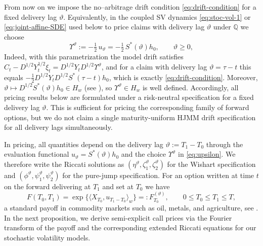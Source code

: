 \documentclass[10pt,a4paper,reqno]{amsart}
\numberwithin{equation}{section}
\theoremstyle{plain}
\theoremstyle{definition}
\theoremstyle{example}
\newcommand{\MQ}{\mathbb{Q}}
\begin{document}
From now on we impose the no–arbitrage drift condition \eqref{eq:drift-condition} for a fixed delivery lag $\vartheta$. 
Equivalently, in the coupled SV dynamics \eqref{eq:stoc-vol-1} or \eqref{eq:joint-affine-SDE} used below to price claims with delivery lag $\vartheta$ under $\MQ$ we choose
\begin{equation}\label{eq:upsilon}
  \Upsilon^\vartheta := -\tfrac12\, u_\vartheta
  = -\tfrac12\, S^*(\vartheta)h_0, 
  \qquad \vartheta\ge0,
\end{equation}
Indeed, with this parametrization the model drift satisfies 
$C_t - D^{1/2}Y_t^{1/2}\xi_t = D^{1/2}Y_t D^{1/2}\Upsilon^\vartheta$,
and for a claim with delivery lag $\vartheta=\tau-t$ this equals 
$-\tfrac12 D^{1/2}Y_t D^{1/2} S^*(\tau-t)h_0$, which is exactly \eqref{eq:drift-condition}.
Moreover, $\vartheta\mapsto D^{1/2}S^*(\vartheta)h_0 \in H_w$ (see \cite[Lem.~6.2]{zbMATH07927020}), 
so $\Upsilon^\vartheta\in H_w$ is well defined.
Accordingly, all pricing results below are formulated under a risk-neutral specification for a fixed delivery lag $\vartheta$. This is sufficient for pricing the corresponding family of forward options, but we do not claim a single maturity-uniform HJMM drift specification for all delivery lags simultaneously.

In pricing, all quantities depend on the delivery lag $\vartheta:=T_1-T_0$ through the evaluation functional $u_\vartheta=S^*(\vartheta)h_0$
and the choice $\Upsilon^\vartheta$ in \eqref{eq:upsilon}. We therefore write the Riccati solutions as
$(\eta^\vartheta,\zeta^\vartheta_1,\zeta^\vartheta_2)$ for the Wishart specification and
$(\phi^\vartheta,\psi^\vartheta_1,\psi^\vartheta_2)$ for the pure-jump specification. 
For an option written at time $t$ on the forward delivering at $T_1$ and set at $T_0$ we have
\begin{equation}\label{eq:forward-rates}
  F(T_0,T_1) 
  = \exp\{\langle X_{T_0}, u_{T_1-T_0}\rangle_w\}
  =: F_{T_0}^{(\vartheta)}, 
  \qquad 0\le T_0\le T_1\le T,
\end{equation}
a standard payoff in commodity markets such as oil, metals, and agriculture, see \cite{benth2012modeling}. 
In the next proposition, we derive semi-explicit call prices via the Fourier transform of the payoff and the
corresponding extended Riccati equations for our stochastic volatility models.
\end{document}
